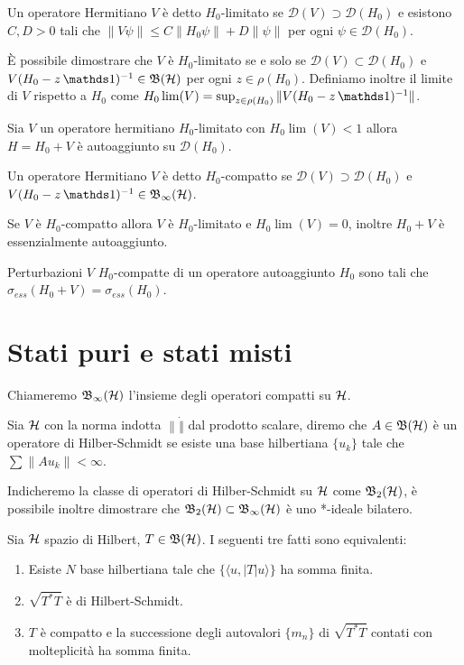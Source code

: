 \begin{definition}
    Un operatore Hermitiano $V$ è detto $H_0$-limitato se $\mathcal{D}(V) \supset \mathcal{D}(H_0)$ e esistono $C,D> 0$ tali che $\| V \psi \| \leq C \| H_0 \psi \| + D \| \psi \|$ per ogni $\psi \in \mathcal{D}(H_0)$. 
\end{definition}

È possibile dimostrare che $V$ è $H_0$-limitato se e solo se $\mathcal{D}(V) \subset \mathcal{D}(H_0)$ e $V(H_0 -z \un)^{-1}\in \B$ per ogni $z \in \rho(H_0)$. Definiamo inoltre il limite di $V$ rispetto a $H_0$ come $H_0\lim(V) = \sup_{z \in \rho(H_0)} \| V(H_0 -z \un)^{-1}\|$.

\begin{theorem}
    Sia $V$ un operatore hermitiano $H_0$-limitato con $H_0\lim(V)< 1$ allora $H = H_0 + V$ è autoaggiunto su $\mathcal{D}(H_0)$.
\end{theorem}

\begin{definition}
    Un operatore Hermitiano $V$ è detto $H_0$-compatto se $\mathcal{D}(V) \supset \mathcal{D}(H_0)$ e $V(H_0 -z \un)^{-1}\in \Bo$.
\end{definition}

Se $V$ è $H_0$-compatto allora $V$ è $H_0$-limitato e $H_0\lim(V) = 0$, inoltre $H_0 + V$ è essenzialmente autoaggiunto.

\begin{theorem}[Weyl]
    Perturbazioni $V$ $H_0$-compatte di un operatore autoaggiunto $H_0$ sono tali che $\sigma_{ess}(H_0 + V) = \sigma_{ess}(H_0)$.
\end{theorem}

\section{Stati puri e stati misti}
Chiameremo $\operatorname{\mathfrak{B}_\infty(\mathcal{H})}$ l'insieme degli operatori compatti su $\operatorname{\mathcal{H}}$.

\begin{definition}
    Sia $\operatorname{\mathcal{H}}$ con la norma indotta $\| \dot \|$ dal prodotto scalare, diremo che $A \in \operatorname{\mathfrak{B}(\mathcal{H})}$ è un operatore di Hilber-Schmidt se esiste una base hilbertiana $\{ u_k\}$ tale che $\sum \|Au_k \|<\infty$. 
\end{definition}

Indicheremo la classe di operatori di Hilber-Schmidt su $\operatorname{\mathcal{H}}$ come $\operatorname{\mathfrak{B}_2(\mathcal{H})}$, è possibile inoltre dimostrare che $\operatorname{\mathfrak{B}_2(\mathcal{H})} \subset \operatorname{\mathfrak{B}_\infty(\mathcal{H})}$ è uno *-ideale bilatero.

\begin{proposition}
    Sia $\operatorname{\mathcal{H}}$ spazio di Hilbert, $T\in \operatorname{\mathfrak{B}(\mathcal{H})}$. I seguenti tre fatti sono equivalenti:
\begin{enumerate}
    \item Esiste $N$ base hilbertiana tale che $\{ \langle u, |T| u \rangle \}$ ha somma finita.
    \item $\sqrt{T^*T}$ è di Hilbert-Schmidt.
    \item $T$ è compatto e la successione degli autovalori $\{m_n\}$ di $\sqrt{T^*T}$ contati con molteplicità ha somma finita. 
\end{enumerate}
\end{proposition}


